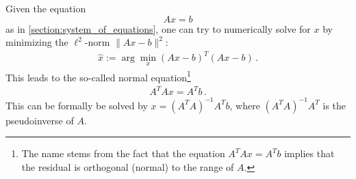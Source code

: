     \begin{method}\label{data:normal_equation}
        Given the equation \[Ax=b\] as in \cref{section:system_of_equations}, one can try to numerically solve for $x$ by minimizing the $\ell^2$-norm $\|Ax-b\|^2$:
        \begin{gather}
            \widehat{x}:=\arg\min_x(Ax-b)^T(Ax-b)\,.
        \end{gather}
        This leads to the so-called normal equation\footnote{The name stems from the fact that the equation $A^TAx = A^Tb$ implies that the residual is orthogonal (normal) to the range of $A$.}
        \begin{gather}
            A^TAx = A^Tb\,.
        \end{gather}
        This can be formally be solved by $x=(A^TA)^{-1}A^Tb$, where $(A^TA)^{-1}A^T$ is the pseudoinverse of $A$.
    \end{method}

